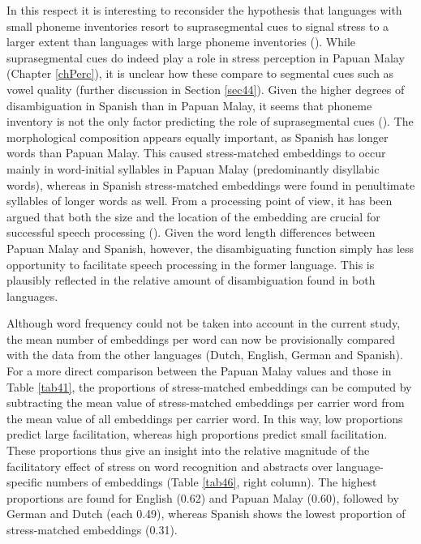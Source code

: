 In this respect it is interesting to reconsider the hypothesis that languages with small phoneme inventories resort to suprasegmental cues to signal stress to a larger extent than languages with large phoneme inventories (\citealt{cutler_phonemic_2004}). While suprasegmental cues do indeed play a role in stress perception in Papuan Malay (Chapter \ref{chPerc}), it is unclear how these compare to segmental cues such as vowel quality (further discussion in Section \ref{sec44}). Given the higher degrees of disambiguation in Spanish than in Papuan Malay, it seems that phoneme inventory is not the only factor predicting the role of suprasegmental cues (\citealt{maddieson_phonological_2011}). The morphological composition appears equally important, as Spanish has longer words than Papuan Malay. This caused stress-matched embeddings to occur mainly in word-initial syllables in Papuan Malay (predominantly disyllabic words), whereas in Spanish stress-matched embeddings were found in penultimate syllables of longer words as well. From a processing point of view, it has been argued that both the size and the location of the embedding are crucial for successful speech processing (\citealt{mcqueen_models_1995}). Given the word length differences between Papuan Malay and Spanish, however, the disambiguating function simply has less opportunity to facilitate speech processing in the former language. This is plausibly reflected in the relative amount of disambiguation found in both languages.\par

Although word frequency could not be taken into account in the current study, the mean number of embeddings per word can now be provisionally compared with the data from the other languages (Dutch, English, German and Spanish). For a more direct comparison between the Papuan Malay values and those in Table \ref{tab41}, the proportions of stress-matched embeddings can be computed by subtracting the mean value of stress-matched embeddings per carrier word from the mean value of all embeddings per carrier word. In this way, low proportions predict large facilitation, whereas high proportions predict small facilitation. These proportions thus give an insight into the relative magnitude of the facilitatory effect of stress on word recognition and abstracts over language-specific numbers of embeddings (Table \ref{tab46}, right column). The highest proportions are found for English (0.62) and Papuan Malay (0.60), followed by German and Dutch (each 0.49), whereas Spanish shows the lowest proportion of stress-matched embeddings (0.31).\par

